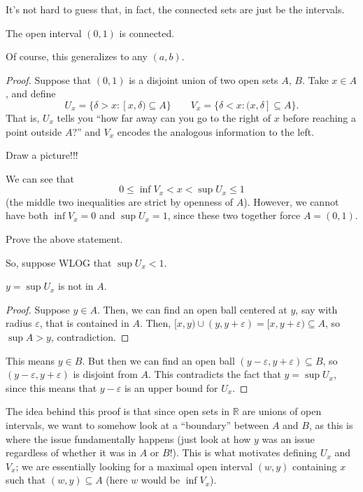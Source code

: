 \documentclass[10pt]{scrartcl}
\providecommand{\eps}{\varepsilon}
\providecommand{\RR}{\mathbb R}
\begin{document}
It's not hard to guess that, in fact, the connected sets
are just be the intervals.
\begin{theorem}
	\label{wk8:thm:open-connected}
	The open interval $(0, 1)$ is connected.
\end{theorem}
Of course, this generalizes to any $(a, b)$.
\begin{proof}
	Suppose that $(0, 1)$ is a disjoint union of two open sets $A$, $B$.
	Take $x\in A$, and define
	\[U_x = \{\delta > x : [x, \delta)\subseteq A\}\qquad
	V_x = \{\delta < x : (x, \delta]\subseteq A\}.\]
	That is, $U_x$ tells you
	``how far away can you go to the right of $x$
	before reaching a point outside $A$?''
	and $V_x$ encodes the analogous information to the left.
	
	\begin{exercise*}
		Draw a picture!!!
	\end{exercise*}
	
	We can see that
	\[0 \le \inf V_x < x < \sup U_x \le 1\]
	(the middle two inequalities are strict by openness of $A$).
	However, we cannot have both
	$\inf V_x = 0$ and $\sup U_x = 1$, since these two together
	force $A = (0, 1)$.
	\begin{exercise*}
		Prove the above statement.
	\end{exercise*}

	So, suppose WLOG that $\sup U_x < 1$.
	
	\begin{claim}
		$y = \sup U_x$ is not in $A$.
	\end{claim}
	\begin{proof}
		Suppose $y\in A$. Then, we can find an open ball
		centered at $y$, say with radius $\eps$, that is contained in $A$.
		Then, $[x,y)\cup(y,y+\eps) = [x,y+\eps)\subseteq A$,
		so $\sup A > y$, contradiction.
	\end{proof}
	
	This means $y\in B$. But then we can find an open ball
	$(y - \eps, y + \eps)\subseteq B$,
	so $(y-\eps,y+\eps)$ is disjoint from $A$.
	This contradicts the fact that $y = \sup U_x$,
	since this means that $y - \eps$ is an upper bound for $U_x$.
\end{proof}

\begin{remark}
	The idea behind this proof is that
	since open sets in $\RR$ are unions of open intervals,
	we want to somehow look at a ``boundary'' between
	$A$ and $B$, as this is where the issue fundamentally happens
	(just look at how $y$ was an issue regardless of
	whether it was in $A$ or $B$!).
	This is what motivates defining $U_x$ and $V_x$;
	we are essentially looking for a maximal open interval
	$(w, y)$ containing $x$ such that $(w, y)\subseteq A$
	(here $w$ would be $\inf V_x$).
\end{remark}
\end{document}

